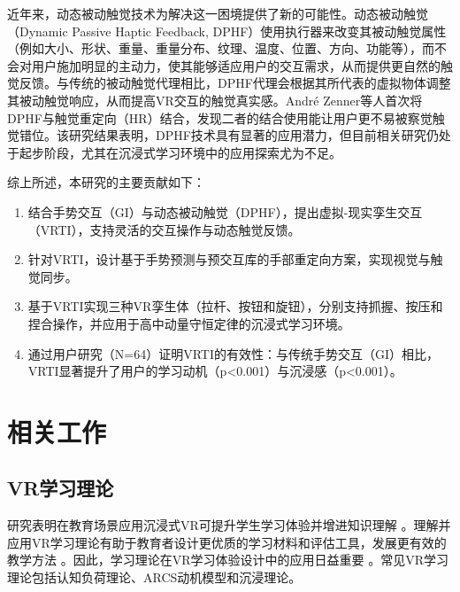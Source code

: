 \documentclass[runningheads]{llncs}
\begin{document}
近年来，动态被动触觉技术为解决这一困境提供了新的可能性\cite{zenner2017shifty}。动态被动触觉（Dynamic Passive Haptic Feedback, DPHF）使用执行器来改变其被动触觉属性（例如大小、形状、重量、重量分布、纹理、温度、位置、方向、功能等），而不会对用户施加明显的主动力，使其能够适应用户的交互需求，从而提供更自然的触觉反馈。与传统的被动触觉代理相比，DPHF代理会根据其所代表的虚拟物体调整其被动触觉响应，从而提高VR交互的触觉真实感。André Zenner等人首次将DPHF与触觉重定向（HR）结合，发现二者的结合使用能让用户更不易被察觉触觉错位\cite{zenner2021combining}。该研究结果表明，DPHF技术具有显著的应用潜力，但目前相关研究仍处于起步阶段，尤其在沉浸式学习环境中的应用探索尤为不足。

综上所述，本研究的主要贡献如下：

\begin{enumerate}[label={\arabic*)}]
  \item 结合手势交互（GI）与动态被动触觉（DPHF），提出虚拟-现实孪生交互（VRTI），支持灵活的交互操作与动态触觉反馈。
  \item 针对VRTI，设计基于手势预测与预交互库的手部重定向方案，实现视觉与触觉同步。
  \item 基于VRTI实现三种VR孪生体（拉杆、按钮和旋钮），分别支持抓握、按压和捏合操作，并应用于高中动量守恒定律的沉浸式学习环境。
  \item 通过用户研究（N=64）证明VRTI的有效性：与传统手势交互（GI）相比，VRTI显著提升了用户的学习动机（p<0.001）与沉浸感（p<0.001）。
\end{enumerate}

\section{相关工作}
\subsection{}
\subsection{}
\subsection{}
\subsection{VR学习理论}
研究表明在教育场景应用沉浸式VR可提升学生学习体验并增进知识理解 \cite{freina2015literature}。理解并应用VR学习理论有助于教育者设计更优质的学习材料和评估工具，发展更有效的教学方法 \cite{matovu2023immersive}。因此，学习理论在VR学习体验设计中的应用日益重要 \cite{marougkas2023virtual}。常见VR学习理论包括认知负荷理论、ARCS动机模型和沉浸理论。
\end{document}
